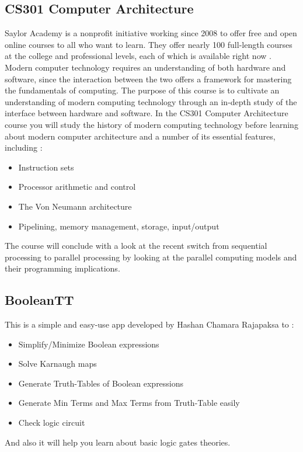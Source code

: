  

 \subsection{CS301 Computer Architecture }
 Saylor Academy is a nonprofit initiative working since 2008 to offer free and open online courses to all who want to learn.
  They offer nearly 100 full-length courses at the college and professional levels, each of which is available right now .
 Modern computer technology requires an understanding of both hardware and software, since the interaction between the two 
 offers a framework for mastering the fundamentals of computing. The purpose of this course is to cultivate an understanding 
 of modern computing technology through an in-depth study of the interface between hardware and software. In the CS301 Computer Architecture course
  you will study the history of modern computing technology before learning about modern computer architecture and a number
   of its essential features, including :
 \begin{itemize}
	 \item Instruction sets
	 \item Processor arithmetic and control
	 \item The Von Neumann architecture
	 \item Pipelining, memory management, storage, input/output
 \end{itemize}  
 The course will conclude with a look at the recent switch from sequential processing to parallel processing by looking at the parallel
  computing models and their programming implications.\cite{Computer-Architecture-saylor-academy}
 
 
 
 \subsection{BooleanTT }
 This is a simple and easy-use app developed by Hashan Chamara Rajapaksa to :
 \begin{itemize}
	 \item Simplify/Minimize Boolean expressions
	 \item Solve Karnaugh maps
	 \item Generate Truth-Tables of Boolean expressions
	 \item Generate Min Terms and Max Terms from Truth-Table easily
	 \item Check logic circuit
 \end{itemize}
 And also it will help you learn about basic logic gates theories.\cite{BooleanTT}
 
